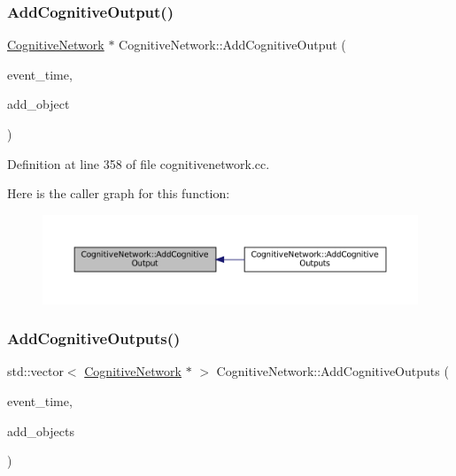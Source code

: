 \subsubsection{\texorpdfstring{Add\+Cognitive\+Output()}{AddCognitiveOutput()}}
{\footnotesize\ttfamily \mbox{\hyperlink{class_cognitive_network}{Cognitive\+Network}} $\ast$ Cognitive\+Network\+::\+Add\+Cognitive\+Output (\begin{DoxyParamCaption}\item[{std\+::chrono\+::time\+\_\+point$<$ \mbox{\hyperlink{universe_8h_a0ef8d951d1ca5ab3cfaf7ab4c7a6fd80}{Clock}} $>$}]{event\+\_\+time,  }\item[{\mbox{\hyperlink{class_cognitive_network}{Cognitive\+Network}} $\ast$}]{add\+\_\+object }\end{DoxyParamCaption})}



Definition at line 358 of file cognitivenetwork.\+cc.

Here is the caller graph for this function\+:\nopagebreak
\begin{figure}[H]
\begin{center}
\leavevmode
\includegraphics[width=350pt]{class_cognitive_network_a8a9b533b89b7d62b21cf41bdf957ef14_icgraph}
\end{center}
\end{figure}
\mbox{\label{class_cognitive_network_a6299433811b76f0ccb97cf69fe9bfb66}} 
\subsubsection{\texorpdfstring{Add\+Cognitive\+Outputs()}{AddCognitiveOutputs()}}
{\footnotesize\ttfamily std\+::vector$<$ \mbox{\hyperlink{class_cognitive_network}{Cognitive\+Network}} $\ast$ $>$ Cognitive\+Network\+::\+Add\+Cognitive\+Outputs (\begin{DoxyParamCaption}\item[{std\+::chrono\+::time\+\_\+point$<$ \mbox{\hyperlink{universe_8h_a0ef8d951d1ca5ab3cfaf7ab4c7a6fd80}{Clock}} $>$}]{event\+\_\+time,  }\item[{std\+::vector$<$ \mbox{\hyperlink{class_cognitive_network}{Cognitive\+Network}} $\ast$$>$}]{add\+\_\+objects }\end{DoxyParamCaption})}



